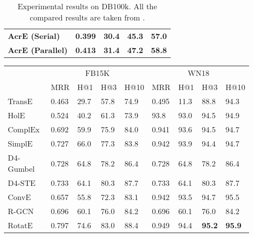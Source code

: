\documentclass[11pt]{article}
\begin{document}
\begin{table}[t]
\begin{tabular}{lllll}
		{\bf AcrE (Serial)} & {\bf 0.399} & {\bf 30.4}  & {\bf 45.3}  & {\bf 57.0} \\
		{\bf AcrE (Parallel)} & {\bf 0.413} & {\bf 31.4}  & {\bf 47.2}    & {\bf 58.8} \\
		\hline
	\end{tabular}\caption{Experimental results on DB100k. All the compared results are taken from .}
	\label{tab:main0}\end{table}

\begin{table}[thbp]
\resizebox{\textwidth}{!}
	{\begin{tabular}{lllllllll}
			\hline
			\multicolumn{1}{r}{} & \multicolumn{4}{c}{FB15K}  & \multicolumn{4}{c}{WN18} \\
			\multicolumn{1}{r}{}  & \multicolumn{1}{l}{MRR} & \multicolumn{1}{l}{H@1} & \multicolumn{1}{l}{H@3} & \multicolumn{1}{l}{H@10} & \multicolumn{1}{l}{MRR} & \multicolumn{1}{l}{H@1} & \multicolumn{1}{l}{H@3} & \multicolumn{1}{l}{H@10} \\
			
			\hline
			
			
			TransE\footnotesize{\cite{Bordes:2013}}& {0.463} & {29.7} & {57.8} & {74.9} & {0.495} & {11.3} &{88.8} &{94.3}\\
			HolE\footnotesize{\cite{Nickel:2016}} & {0.524} & {40.2} & {61.3} & {73.9} & {93.8} & {93.0} &{94.5} &{94.9}\\
			ComplEx\footnotesize{\cite{Trouillon:2016}} & 0.692 & 59.9 & 75.9 &84.0   &0.941 &93.6 &94.5 &94.7      \\
			SimplE\footnotesize{\cite{Kazemi:2018}}  &0.727 & 66.0 & 77.3 &83.8   &0.942 &93.9 &94.4 &94.7     \\
			D4-Gumbel\footnotesize{\cite{Xu:2019}}  & 0.728 & 64.8 & 78.2 &86.4   &0.728 &64.8 &78.2 &86.4     \\
			D4-STE\footnotesize{\cite{Xu:2019}} & 0.733 & 64.1 & 80.3 &87.7        &0.733 &64.1 &80.3 &87.7 \\
			ConvE\footnotesize{\cite{Dettmers:2018}} & 0.657 & 55.8 & 72.3 &83.1    &0.942 &93.5 &94.7 &95.5     \\
			
			R-GCN\footnotesize{\cite{Schlichtkrull:2018}}  & 0.696 & 60.1 & 76.0 &84.2   &0.696 &60.1 &76.0 &84.2      \\
RotatE\footnotesize{\cite{Sun:2019}}  & 0.797 & 74.6 & 83.0 &88.4   &0.949 &94.4 &{\bf 95.2} &{\bf 95.9 }     \\
			

\end{tabular}}
\end{table}
\end{document}
